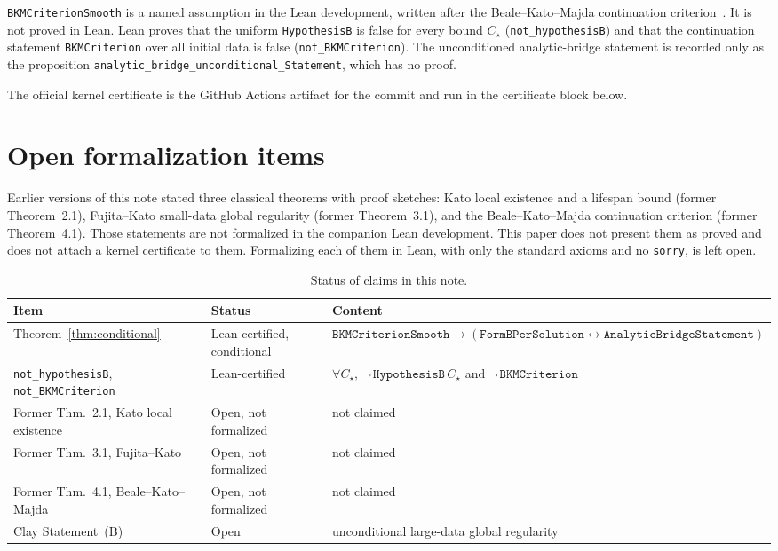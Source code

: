 \documentclass[11pt,a4paper]{article}
\begin{document}
\texttt{BKMCriterionSmooth} is a named assumption in the Lean development, written after the Beale--Kato--Majda continuation criterion~\cite{BKM1984}. It is not proved in Lean. Lean proves that the uniform \texttt{HypothesisB} is false for every bound \(C_\star\) (\texttt{not\_hypothesisB}) and that the continuation statement \texttt{BKMCriterion} over all initial data is false (\texttt{not\_BKMCriterion}). The unconditioned analytic-bridge statement is recorded only as the proposition \texttt{analytic\_bridge\_unconditional\_Statement}, which has no proof.

The official kernel certificate is the GitHub Actions artifact for the commit and run in the certificate block below.

\section{Open formalization items}

Earlier versions of this note stated three classical theorems with proof sketches: Kato local existence and a lifespan bound (former Theorem~2.1), Fujita--Kato small-data global regularity (former Theorem~3.1), and the Beale--Kato--Majda continuation criterion (former Theorem~4.1). Those statements are not formalized in the companion Lean development. This paper does not present them as proved and does not attach a kernel certificate to them. Formalizing each of them in Lean, with only the standard axioms and no \texttt{sorry}, is left open.

\begin{table}[htbp]
\centering
\caption{Status of claims in this note.}
\label{tab:status}
\begin{tabular}{@{}llp{6.8cm}@{}}
\toprule
\textbf{Item} & \textbf{Status} & \textbf{Content} \\
\midrule
Theorem~\ref{thm:conditional} & Lean-certified, conditional & \(\texttt{BKMCriterionSmooth}\to(\texttt{FormBPerSolution}\leftrightarrow\texttt{AnalyticBridgeStatement})\) \\
\texttt{not\_hypothesisB}, \texttt{not\_BKMCriterion} & Lean-certified & \(\forall C_\star,\ \neg\,\texttt{HypothesisB}\,C_\star\) and \(\neg\,\texttt{BKMCriterion}\) \\
Former Thm.~2.1, Kato local existence & Open, not formalized & not claimed \\
Former Thm.~3.1, Fujita--Kato & Open, not formalized & not claimed \\
Former Thm.~4.1, Beale--Kato--Majda & Open, not formalized & not claimed \\
Clay Statement~(B) & Open & unconditional large-data global regularity \\
\bottomrule
\end{tabular}
\end{table}
\end{document}
